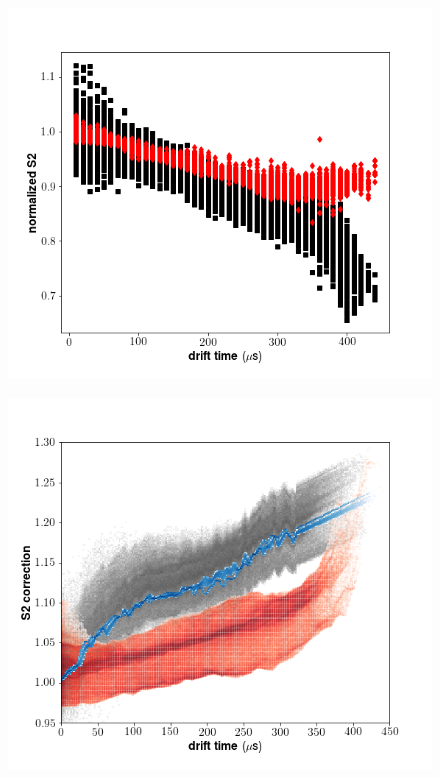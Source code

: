 \begin{figure}[h!]
\centering
\includegraphics[width=150mm]{Figures/S2trend_dt.png}
\caption{}
\label{fig:S2trend_dt} 
\end{figure}

\begin{figure}[h!]
\centering
\includegraphics[width=150mm]{Figures/S2corr_dt.png}
\caption{}
\label{fig:S2corr_dt} 
\end{figure}

